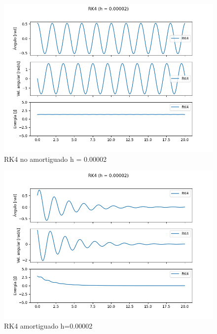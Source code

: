 \documentclass[titlepage,a4paper]{article}
\begin{document}
    \begin{figure}[!htb]
        \centering
        \includegraphics[scale = 0.7]{GraficosRK4/rk4_00002 no amortiguado.png}
        \caption{RK4 no amortiguado h = 0.00002}
    \end{figure}
    
    \begin{figure}[!htb]
        \centering
        \includegraphics[scale = 0.6]{GraficosRK4/rk4_00002_amortiguado.png}
        \caption{RK4 amortiguado h=0.00002}
    \end{figure}
    
\end{document}
